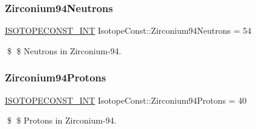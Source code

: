 \subsubsection{\texorpdfstring{Zirconium94\+Neutrons}{Zirconium94Neutrons}}
{\footnotesize\ttfamily \mbox{\hyperlink{group___isotope_const-_macros_ga5f18360b3e99483a35c32d789e62621c}{I\+S\+O\+T\+O\+P\+E\+C\+O\+N\+S\+T\+\_\+\+I\+NT}} Isotope\+Const\+::\+Zirconium94\+Neutrons = 54}

\$ \$ Neutrons in Zirconium-\/94. \mbox{\label{group___isotope_const-_zirconium-_zr94_ga019ec7e9a81fb17eab5f70ee8201de2a}} 
\subsubsection{\texorpdfstring{Zirconium94\+Protons}{Zirconium94Protons}}
{\footnotesize\ttfamily \mbox{\hyperlink{group___isotope_const-_macros_ga5f18360b3e99483a35c32d789e62621c}{I\+S\+O\+T\+O\+P\+E\+C\+O\+N\+S\+T\+\_\+\+I\+NT}} Isotope\+Const\+::\+Zirconium94\+Protons = 40}

\$ \$ Protons in Zirconium-\/94. 
